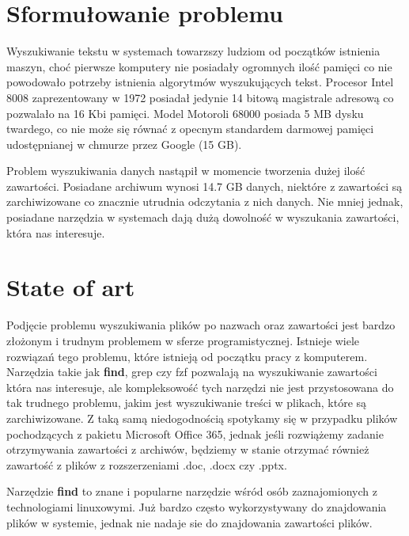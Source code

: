 \section{Sformułowanie problemu}
Wyszukiwanie tekstu w systemach towarzszy ludziom od początków istnienia maszyn,
choć pierwsze komputery nie posiadały ogromnych ilość pamięci co nie powodowało
potrzeby istnienia algorytmów wyszukujących tekst. Procesor Intel 8008 
zaprezentowany w 1972 posiadał jedynie 14 bitową magistrale adresową co 
pozwalało na 16 Kbi pamięci. Model Motoroli 68000 posiada 5 MB dysku twardego,
co nie może się równać z opecnym standardem darmowej pamięci udostępnianej w 
chmurze przez Google (15 GB).

Problem wyszukiwania danych nastąpił w momencie tworzenia dużej ilość zawartości.
Posiadane archiwum wynosi 14.7 GB danych, niektóre z zawartości są 
zarchiwizowane co znacznie utrudnia odczytania z nich danych. Nie mniej jednak,
posiadane narzędzia w systemach dają dużą dowolność w wyszukania zawartości,
która nas interesuje.

\section{State of art}

Podjęcie problemu wyszukiwania plików po nazwach oraz zawartości jest bardzo
złożonym i trudnym problemem w sferze programistycznej. Istnieje wiele rozwiązań
tego problemu, które istnieją od początku pracy z komputerem. Narzędzia takie
jak \textbf{find}, grep czy fzf \cite{bib:internet:Fzf} pozwalają na wyszukiwanie zawartości która nas interesuje,
ale kompleksowość tych narzędzi nie jest przystosowana do tak trudnego problemu,
jakim jest wyszukiwanie treści w plikach, które są zarchiwizowane. Z taką samą
niedogodnością spotykamy się w przypadku plików pochodzących z pakietu Microsoft
Office 365, jednak jeśli rozwiążemy zadanie otrzymywania zawartości z archiwów,
będziemy w stanie otrzymać również zawartość z plików z rozszerzeniami .doc,
.docx czy .pptx.

Narzędzie \textbf{find} to znane i popularne narzędzie wśród osób zaznajomionych z
technologiami linuxowymi. Już bardzo często wykorzystywany do znajdowania plików
w systemie, jednak nie nadaje sie do znajdowania zawartości plików.

